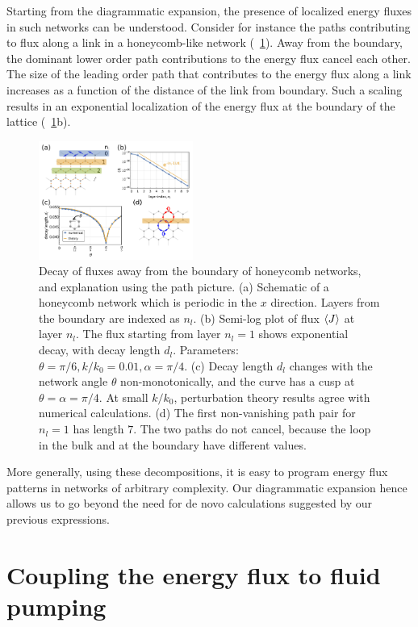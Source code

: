 \documentclass[
 preprint,
 preprintnumbers,
 amsmath,amssymb,
 aps,
 pre,
 longbibliography,
 superscriptaddress,
 10pt, twocolumn
]{revtex4-1}
\begin{document}
Starting from the  diagrammatic expansion, the presence of localized energy fluxes in such networks can be understood. Consider for instance the paths contributing to flux along a link in a honeycomb-like network (\figurename~\ref{fig:path_decay}). Away from the boundary, the dominant lower order path contributions to the energy flux cancel each other. The size of the leading order path that contributes to the energy flux along a link increases as a function of the distance of the link from boundary. Such a scaling results in an exponential localization of the energy flux at the boundary of the lattice (\figurename~\ref{fig:path_decay}b).
\begin{figure}[ht]
	\centering
	\includegraphics[width=0.45\textwidth]{5_path_decay.pdf}
    \caption{Decay of fluxes away from the boundary of honeycomb networks, and explanation using the path picture.
    (a) Schematic of a honeycomb network which is periodic in the $x$ direction. Layers from the boundary are indexed as $n_l$.
    (b) Semi-log plot of flux $\expval{J}$ at layer $n_l$. The flux starting from layer $n_l=1$ shows exponential decay, with decay length $d_l$. Parameters: $\theta = \pi/6, k/k_0 = 0.01, \alpha = \pi/4$.
    (c) Decay length $d_l$ changes with the network angle $\theta$ non-monotonically, and the curve has a cusp at $\theta = \alpha = \pi/4$. At small $k/k_0$, perturbation theory results agree with numerical calculations.
    (d) The first non-vanishing path pair for $n_l=1$ has length $7$. The two paths do not cancel, because the loop in the bulk and at the boundary have different values.
    }
    \label{fig:path_decay}
\end{figure}

More generally, using these decompositions, it is easy to program energy flux patterns in networks of arbitrary complexity. Our diagrammatic expansion hence allows us to go beyond the need for de novo calculations suggested by our previous expressions.


\section{Coupling the energy flux to fluid pumping} \label{sec:swimmer}
\end{document}
